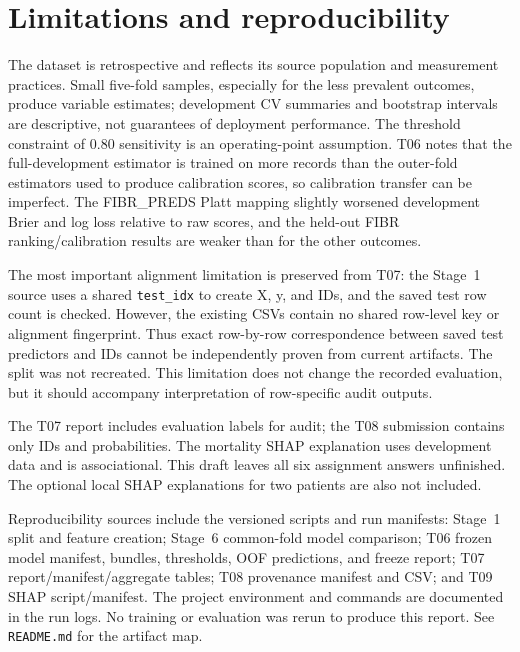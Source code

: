 \section{Limitations and reproducibility}
The dataset is retrospective and reflects its source population and measurement practices. Small five-fold samples, especially for the less prevalent outcomes, produce variable estimates; development CV summaries and bootstrap intervals are descriptive, not guarantees of deployment performance. The threshold constraint of 0.80 sensitivity is an operating-point assumption. T06 notes that the full-development estimator is trained on more records than the outer-fold estimators used to produce calibration scores, so calibration transfer can be imperfect. The FIBR\_PREDS Platt mapping slightly worsened development Brier and log loss relative to raw scores, and the held-out FIBR ranking/calibration results are weaker than for the other outcomes.

The most important alignment limitation is preserved from T07: the Stage~1 source uses a shared \texttt{test\_idx} to create X, y, and IDs, and the saved test row count is checked. However, the existing CSVs contain no shared row-level key or alignment fingerprint. Thus exact row-by-row correspondence between saved test predictors and IDs cannot be independently proven from current artifacts. The split was not recreated. This limitation does not change the recorded evaluation, but it should accompany interpretation of row-specific audit outputs.

The T07 report includes evaluation labels for audit; the T08 submission contains only IDs and probabilities. The mortality SHAP explanation uses development data and is associational. This draft leaves all six assignment answers unfinished. The optional local SHAP explanations for two patients are also not included.

Reproducibility sources include the versioned scripts and run manifests: Stage~1 split and feature creation; Stage~6 common-fold model comparison; T06 frozen model manifest, bundles, thresholds, OOF predictions, and freeze report; T07 report/manifest/aggregate tables; T08 provenance manifest and CSV; and T09 SHAP script/manifest. The project environment and commands are documented in the run logs. No training or evaluation was rerun to produce this report. See \texttt{README.md} for the artifact map.
